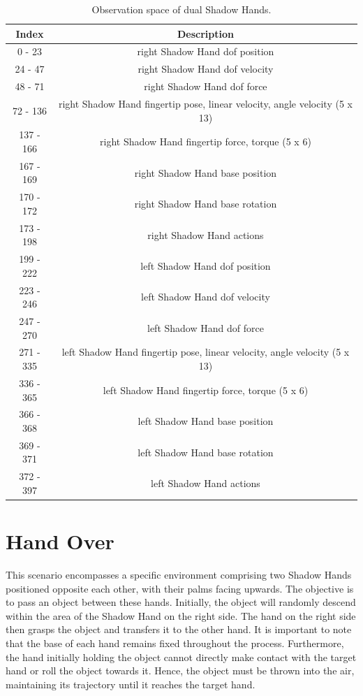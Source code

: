 \documentclass{article}
\begin{document}
\begin{table}[htbp]
    \centering
    \caption{Observation space of dual Shadow Hands.}
    \begin{tabular}{c|c}
    \toprule  %
    Index&Description\\\hline
    0 - 23&	right Shadow Hand dof position\\\hline
    24 - 47&	right Shadow Hand dof velocity\\\hline
    48 - 71	& right Shadow Hand dof force\\\hline
    72 - 136&	right Shadow Hand fingertip pose, linear velocity, angle velocity (5 x 13)\\\hline
    137 - 166&	right Shadow Hand fingertip force, torque (5 x 6)\\\hline
    167 - 169&	right Shadow Hand base position\\\hline
    170 - 172&	right Shadow Hand base rotation\\\hline
    173 - 198&	right Shadow Hand actions\\\hline
    
    199 - 222&	left Shadow Hand dof position\\\hline
    223 - 246&	left Shadow Hand dof velocity\\\hline
    247 - 270	& left Shadow Hand dof force\\\hline
    271 - 335&	left Shadow Hand fingertip pose, linear velocity, angle velocity (5 x 13)\\\hline
    336 - 365&	left Shadow Hand fingertip force, torque (5 x 6)\\\hline
    366 - 368&	left Shadow Hand base position\\\hline
    369 - 371&	left Shadow Hand base rotation\\\hline
    372 - 397&	left Shadow Hand actions\\
    \bottomrule %
    \end{tabular}
    \label{observation_dual hands}
\end{table}

\section*{Hand Over}

This scenario encompasses a specific environment comprising two Shadow Hands positioned opposite each other, with their palms facing upwards. The objective is to pass an object between these hands. Initially, the object will randomly descend within the area of the Shadow Hand on the right side. The hand on the right side then grasps the object and transfers it to the other hand. It is important to note that the base of each hand remains fixed throughout the process. Furthermore, the hand initially holding the object cannot directly make contact with the target hand or roll the object towards it. Hence, the object must be thrown into the air, maintaining its trajectory until it reaches the target hand.
\end{document}
